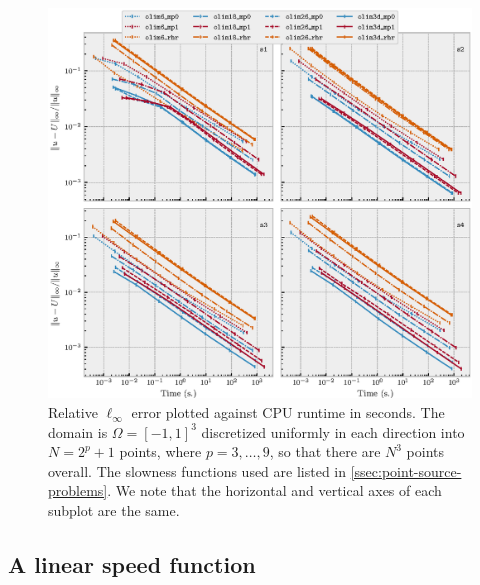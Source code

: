 \documentclass[sisc-eikonal.tex]{subfiles}
\begin{document}
\begin{figure}
  \centering \includegraphics[width=\linewidth]{time_vs_error_3d.eps}
  \caption{Relative $\ell_\infty$ error plotted against CPU runtime in
    seconds. The domain is $\Omega = [-1, 1]^3$ discretized uniformly
    in each direction into $N = 2^p + 1$ points, where
    $p = 3, \hdots, 9$, so that there are $N^3$ points overall. The
    slowness functions used are listed in
    \cref{ssec:point-source-problems}. We note that the horizontal and
    vertical axes of each subplot are the
    same.}\label{fig:time-vs-error}
\end{figure}

\subsection{A linear speed function}\label{ssec:slotnick}
\end{document}
